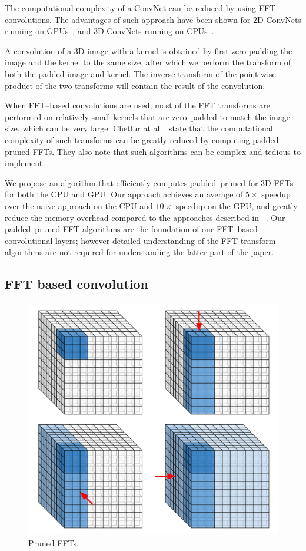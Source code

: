\documentclass[conference]{IEEEtran}
\begin{document}
  The computational complexity of a ConvNet can be reduced by using
  FFT convolutions.  The advantages of such approach have been shown
  for 2D ConvNets running on
  GPUs~\cite{mathieu-iclr-14,vasilache2014fast}, and 3D ConvNets
  running on CPUs~\cite{zlateski2015znn}.

  A convolution of a 3D image with a kernel is obtained by first zero
  padding the image and the kernel to the same size, after which we
  perform the transform of both the padded image and kernel.  The
  inverse transform of the point-wise product of the two transforms
  will contain the result of the convolution.

  When FFT--based convolutions are used, most of the FFT transforms
  are performed on relatively small kernels that are zero--padded to
  match the image size, which can be very large.  Chetlur at
  al.~\cite{chetlur2014cudnn} state that the computational complexity
  of such transforms can be greatly reduced by computing
  padded--pruned FFTs.  They also note that such algorithms can be
  complex and tedious to implement.

  We propose an algorithm that efficiently computes padded--pruned for
  3D FFTs for both the CPU and GPU. Our approach achieves an average
  of $5 \times$ speedup over the naive approach on the CPU and $10
  \times$ speedup on the GPU, and greatly reduce the memory overhead
  compared to the approaches described in
  ~\cite{mathieu-iclr-14,vasilache2014fast}.  Our padded--pruned FFT
  algorithms are the foundation of our FFT--based convolutional
  layers; however detailed understanding of the FFT transform
  algorithms are not required for understanding the latter part of the
  paper.

\subsection{FFT based convolution}

  \begin{figure}
    \begin{center}
      \includegraphics[width=0.55\columnwidth]{fig/pruned_ffts.pdf}
    \end{center}
    \caption{Pruned FFTs.}
    \label{fig:pruned_ffts}
  \end{figure}
\end{document}
